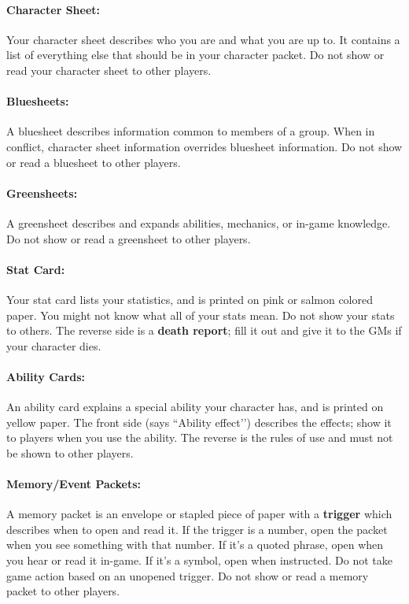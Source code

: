 \documentclass[sheet]{GL2020}
\begin{document}
\paragraph{Character Sheet:} Your character sheet describes who you are and what you are up to.  It contains a list of everything else that should be in your character packet. Do not show or read your character sheet to other players.

\paragraph{Bluesheets:} A bluesheet describes information common to members of a group.  When in conflict, character sheet information overrides bluesheet information. Do not show or read a bluesheet to other players.

\paragraph{Greensheets:} A greensheet describes and expands abilities, mechanics, or in-game knowledge. Do not show or read a greensheet to other players.

\paragraph{Stat Card:} Your stat card lists your statistics, and is printed on pink or salmon colored paper. You might not know what all of your stats mean. Do not show your stats to others. The reverse side is a {\bf death report}; fill it out and give it to the GMs if your character dies.

\paragraph{Ability Cards:} An ability card explains a special ability your character has, and is printed on yellow paper. The front side (says ``Ability effect’’) describes the effects; show it to players when you use the ability.  The reverse is the rules of use and must not be shown to other players.

\paragraph{Memory/Event Packets:} A memory packet is an envelope or stapled piece of paper with a {\bf trigger} which describes when to open and read it. If the trigger is a number, open the packet when you see something with that number. If it's a quoted phrase, open when you hear or read it in-game.  If it's a symbol, open when instructed. Do not take game action based on an unopened trigger. Do not show or read a memory packet to other players.
\end{document}
